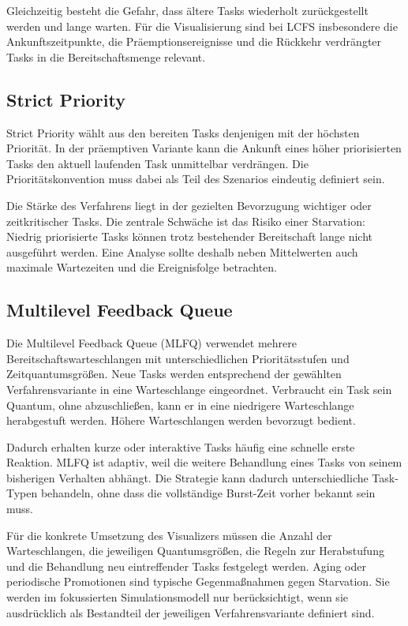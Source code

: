 Gleichzeitig besteht die Gefahr, dass ältere Tasks wiederholt zurückgestellt werden und lange warten. Für die Visualisierung sind bei LCFS insbesondere die Ankunftszeitpunkte, die Präemptionsereignisse und die Rückkehr verdrängter Tasks in die Bereitschaftsmenge relevant.

\subsection{Strict Priority}

Strict Priority wählt aus den bereiten Tasks denjenigen mit der höchsten Priorität. In der präemptiven Variante kann die Ankunft eines höher priorisierten Tasks den aktuell laufenden Task unmittelbar verdrängen. Die Prioritätskonvention muss dabei als Teil des Szenarios eindeutig definiert sein.

Die Stärke des Verfahrens liegt in der gezielten Bevorzugung wichtiger oder zeitkritischer Tasks. Die zentrale Schwäche ist das Risiko einer Starvation: Niedrig priorisierte Tasks können trotz bestehender Bereitschaft lange nicht ausgeführt werden. Eine Analyse sollte deshalb neben Mittelwerten auch maximale Wartezeiten und die Ereignisfolge betrachten.

\subsection{Multilevel Feedback Queue}

Die Multilevel Feedback Queue (MLFQ) verwendet mehrere Bereitschaftswarteschlangen mit unterschiedlichen Prioritätsstufen und Zeitquantumsgrößen. Neue Tasks werden entsprechend der gewählten Verfahrensvariante in eine Warteschlange eingeordnet. Verbraucht ein Task sein Quantum, ohne abzuschließen, kann er in eine niedrigere Warteschlange herabgestuft werden. Höhere Warteschlangen werden bevorzugt bedient.

Dadurch erhalten kurze oder interaktive Tasks häufig eine schnelle erste Reaktion. MLFQ ist adaptiv, weil die weitere Behandlung eines Tasks von seinem bisherigen Verhalten abhängt. Die Strategie kann dadurch unterschiedliche Task-Typen behandeln, ohne dass die vollständige Burst-Zeit vorher bekannt sein muss.

Für die konkrete Umsetzung des Visualizers müssen die Anzahl der Warteschlangen, die jeweiligen Quantumsgrößen, die Regeln zur Herabstufung und die Behandlung neu eintreffender Tasks festgelegt werden. Aging oder periodische Promotionen sind typische Gegenmaßnahmen gegen Starvation. Sie werden im fokussierten Simulationsmodell nur berücksichtigt, wenn sie ausdrücklich als Bestandteil der jeweiligen Verfahrensvariante definiert sind.

